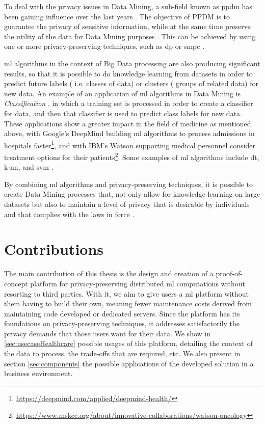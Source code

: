 To deal with the privacy issues in Data Mining, a sub-field known as \ac{ppdm} has been gaining influence over the last years \cite{DAcquisto2015}. The objective of PPDM is to guarantee the privacy of sensitive information, while at the same time preserve the utility of the data for Data Mining purposes \cite{agrawal2000privacy}.
This can be achieved by using one or more privacy-preserving techniques, such as \ac{dp} \cite{Danezis2015} or \ac{smpc} \cite{DAcquisto2015}.


\ac{ml} algorithms in the context of Big Data processing are also producing significant results, so that it is possible to do knowledge learning from datasets in order to predict future labels ( i.e. classes of data) or clusters ( groups of related data) for new data. An example of an application of \ac{ml} algorithms in Data Mining is \textit{Classification} \cite{LeiXu2014}, in which a training set is processed in order to create a classifier for data, and then that classifier is used to predict class labels for new data. These applications show a greater impact in the field of medicine as mentioned above, with Google's DeepMind building \ac{ml} algorithms to process admissions in hospitals faster\footnote{\url{https://deepmind.com/applied/deepmind-health/}}, and with IBM's Watson supporting medical personnel consider treatment options for their patients\footnote{\url{https://www.mskcc.org/about/innovative-collaborations/watson-oncology}}.
Some examples of \ac{ml} algorithms include \ac{dt}, \ac{k-nn}, and \ac{svm} \cite{LeiXu2014}.

By combining \ac{ml} algorithms and privacy-preserving techniques, it is possible to create Data Mining processes that, not only allow for knowledge learning on large datasets but also to maintain a level of privacy that is desirable by individuals and that complies with the laws in force \cite{DAcquisto2015}.



\section{Contributions}
\label{sec:Intro_Contributions}

The main contribution of this thesis is the design and creation of a proof-of-concept platform for privacy-preserving distributed \ac{ml} computations without resorting to third parties. With it, we aim to give users a \ac{ml} platform without them having to build their own, meaning fewer maintenance costs derived from maintaining code developed or dedicated servers. Since the platform has its foundations on privacy-preserving techniques, it addresses satisfactorily the privacy demands that those users want for their data.
We show in \ref{sec:usecaseHealthcare} possible usages of this platform, detailing the context of the data to process, the trade-offs that are required, etc. We also present in section \ref{sec:components} the possible applications of the developed solution in a business environment.

